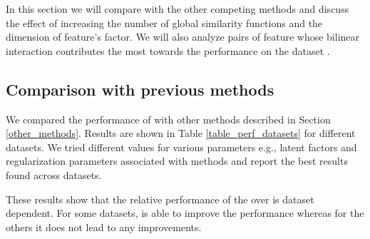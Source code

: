 In this section we will compare \CF with the other competing methods and discuss the
effect of increasing the number of global similarity functions and the dimension of
feature's factor. We will also analyze pairs of feature whose bilinear interaction
contributes the most towards the performance on the dataset \MLHR.

\subsection{Comparison with previous methods}
We compared the performance of \CF with other methods described in Section
\ref{other_methods}.
Results are shown in Table \ref{table_perf_datasets} for different datasets. 
We tried different values for various parameters e.g., latent factors and regularization parameters
associated with methods and report the best results found across datasets.

\iffalse

\begin{figure}
  \centering
  \subfloat[ML-HR]{%
    \texttt{[image: facDim\_recall\_mlhr]}}
  \quad
  \subfloat[CUL]{%
    \texttt{[image: facDim\_recall\_cul]}}
  \caption{Effect of latent factors on recall}
  \label{latFacEffect}
\end{figure}
\fi

\iffalse

\begin{figure}[h!]
  \centering
  \subfloat[ML-HR]{%
    \texttt{[image: nSim\_recall\_mlhr]}}
  \quad
  \subfloat[CUL]{%
    \texttt{[image: nSim\_recall\_cul]}}
  \caption{Effect of number of global similarity functions on recall}
  \label{nSimEffect}
\end{figure}

\fi


\def\arraystretch{1.5}%


These results show that the relative performance of the \CF over \CFLIN is dataset
dependent. For some datasets, \CF is able to improve the performance whereas 
for the others it does not lead to any improvements.

